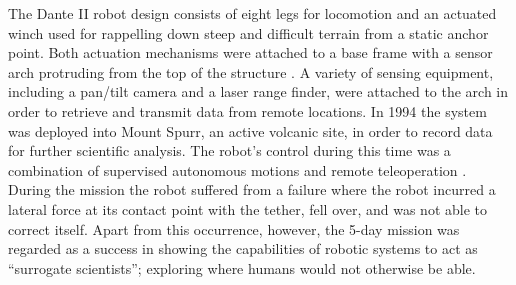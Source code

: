 \documentclass[12pt]{article}
\begin{document}
The Dante II robot design consists of eight legs for locomotion and an 
actuated winch used for rappelling down steep and difficult terrain from a static anchor point. 
Both actuation mechanisms were attached to 
a base frame with a sensor arch protruding from the top of the structure \cite{dante_design}. A variety of
sensing equipment, including a pan/tilt camera and a laser range finder,
 were attached to the arch in order to retrieve and transmit data from remote
 locations. In 1994 the system was deployed into Mount Spurr, an active volcanic site, 
 in order to record data for further scientific analysis. The robot's control 
 during this time was a combination of supervised autonomous motions and remote
 teleoperation \cite{dante_results}. During the mission the robot suffered from a failure 
 where the robot incurred a lateral force at its contact
point with the tether, fell over, and was not able to correct itself. Apart from this occurrence, however, 
the 5-day mission was regarded as a success in showing the capabilities of robotic systems to act as ``surrogate scientists''; exploring where humans would not otherwise be able. 
\end{document}
